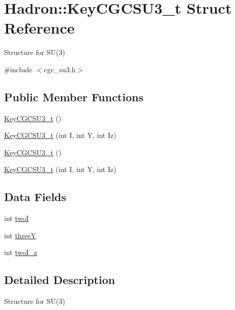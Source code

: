 \hypertarget{structHadron_1_1KeyCGCSU3__t}{}\section{Hadron\+:\+:Key\+C\+G\+C\+S\+U3\+\_\+t Struct Reference}
\label{structHadron_1_1KeyCGCSU3__t}


Structure for S\+U(3)  




{\ttfamily \#include $<$cgc\+\_\+su3.\+h$>$}

\subsection*{Public Member Functions}
\begin{DoxyCompactItemize}
\item 
\mbox{\hyperlink{structHadron_1_1KeyCGCSU3__t_a54336691c05ca5cdc4d34e5bf63a9ad3}{Key\+C\+G\+C\+S\+U3\+\_\+t}} ()
\item 
\mbox{\hyperlink{structHadron_1_1KeyCGCSU3__t_a1b0584c75fa2b450db1e3ad40d7422a2}{Key\+C\+G\+C\+S\+U3\+\_\+t}} (int I, int Y, int Iz)
\item 
\mbox{\hyperlink{structHadron_1_1KeyCGCSU3__t_a54336691c05ca5cdc4d34e5bf63a9ad3}{Key\+C\+G\+C\+S\+U3\+\_\+t}} ()
\item 
\mbox{\hyperlink{structHadron_1_1KeyCGCSU3__t_a1b0584c75fa2b450db1e3ad40d7422a2}{Key\+C\+G\+C\+S\+U3\+\_\+t}} (int I, int Y, int Iz)
\end{DoxyCompactItemize}
\subsection*{Data Fields}
\begin{DoxyCompactItemize}
\item 
int \mbox{\hyperlink{structHadron_1_1KeyCGCSU3__t_a0c1919df3ee3e6a2a98899d4949f7821}{twoI}}
\item 
int \mbox{\hyperlink{structHadron_1_1KeyCGCSU3__t_ab257467df495ae17d64e36cb79cb5a91}{threeY}}
\item 
int \mbox{\hyperlink{structHadron_1_1KeyCGCSU3__t_a2327b80f179837e064ee74a124d58ee9}{two\+I\+\_\+z}}
\end{DoxyCompactItemize}


\subsection{Detailed Description}
Structure for S\+U(3) 

